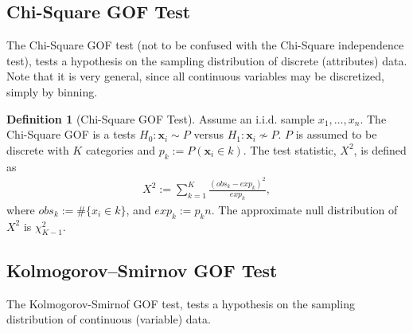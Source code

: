 \documentclass[12pt,a4paper]{report}
\theoremstyle{plain}
\theoremstyle{definition}
\newtheorem{definition}{Definition}
\newcommand{\set}[1]{\{ #1 \}} \newcommand{\setII}[1]{\left\{ #1 \right\}} \newcommand{\rv}[1]{\mathbf{#1}} \newcommand{\x}{\rv x} \newcommand{\y}{\rv y} \newcommand{\U}{\rv u} \newcommand{\T}{\rv t} \newcommand{\X}{\rv X} \newcommand{\Y}{\rv Y} \newcommand{\expect}[1]{\mathbf{E}\left[ #1 \right]} \newcommand{\expectg}[2]{\mathbf{E}_{\rv{#1}}\left[ \rv{#2} \right]} \newcommand{\expectn}[1]{\mathbb{E}\left[#1\right]} \newcommand{\cov}[1]{\mathbf{Cov} \left[ #1 \right]} \newcommand{\var}[1]{\mathop{Var} \left[ #1 \right]} \newcommand{\covn}[1]{\mathbb{Cov} \left[ #1 \right]} \newcommand{\gauss}[1]{\mathcal{N}\left(#1\right)} \newcommand{\cdf}[2]{F_{#1} (#2)} \newcommand{\survive}[2]{S_{#1} (#2)} \newcommand{\hazard}[2]{h_{#1} (#2)} \newcommand{\cuhazard}[2]{H_{#1} (#2)} \newcommand{\cdfn}[2]{\mathbb{F}_{#1}(#2)} \newcommand{\icdf}[2]{F_\rv{#1}^{-1} (#2)} \newcommand{\icdfn}[2]{\mathbb{F}^{-1}_{#1}(#2)} \newcommand{\pdf}[2]{p_{#1} (#2)} \newcommand{\prob}[1]{P\left( #1 \right)} \newcommand{\dist}{P} \newcommand{\density}{p}
\begin{document}
\subsection{Chi-Square GOF Test}
The Chi-Square GOF test (not to be confused with the Chi-Square independence test), tests a hypothesis on the sampling distribution of discrete (attributes) data. 
Note that it is very general, since all continuous variables may be discretized, simply by binning.

\begin{definition}[Chi-Square GOF Test]
Assume an i.i.d. sample $x_1,\dots,x_n$. 
The Chi-Square GOF is a tests $H_0: \x_i \sim \dist$ versus $H_1: \x_i \not\sim \dist$.
$P$ is assumed to be discrete with $K$ categories and $p_k:= \dist(\x_i \in k)$.
The test statistic, $X^2$, is defined as
\begin{align}
	X^2:= \sum_{k=1}^{K}\frac{(obs_k-exp_k)^2}{exp_k}, 
\end{align}
where $obs_k:= \#\set{x_i \in k}$, and $exp_k:= p_k n$.
The approximate null distribution of $X^2$ is $\chi^2_{K-1}$.
\end{definition} 



\subsection{Kolmogorov–Smirnov GOF Test}
The Kolmogorov-Smirnof GOF test, tests a hypothesis on the sampling distribution of continuous (variable) data. 
\end{document}
